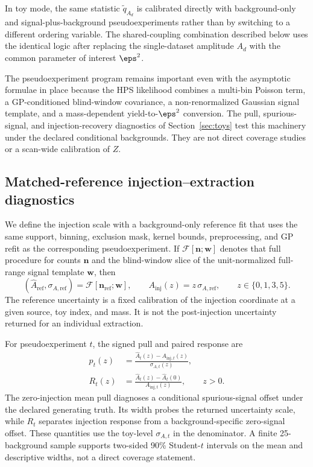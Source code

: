 In toy mode, the same statistic $\tilde q_{A_d}$ is calibrated directly with
background-only and signal-plus-background pseudoexperiments rather than by switching
to a different ordering variable. The shared-coupling combination described below uses
the identical logic after replacing the single-dataset amplitude $A_d$ with the common
parameter of interest $\eps^2$.

The pseudoexperiment program remains important even with the asymptotic formulae in
place because the HPS likelihood combines a multi-bin Poisson term, a GP-conditioned
blind-window covariance, a non-renormalized Gaussian signal template, and a
mass-dependent yield-to-$\eps^2$ conversion. The pull, spurious-signal, and
injection-recovery diagnostics of Section~\ref{sec:toys} test this machinery under the
declared conditional backgrounds. They are not direct \CLs{} coverage studies or a
scan-wide calibration of $Z$.

\subsection{Matched-reference injection--extraction diagnostics}
\label{sec:matched-reference-diagnostics}

We define the injection scale with a background-only reference fit that uses the same
support, binning, exclusion mask, kernel bounds, preprocessing, and GP refit as the
corresponding pseudoexperiment. If
$\mathcal{F}[\bm n;\bm w]$ denotes that full procedure for counts $\bm n$ and the
blind-window slice of the unit-normalized full-range signal template $\bm w$, then
\begin{equation}
(\widehat A_{\mathrm{ref}},\sigma_{A,\mathrm{ref}})
=\mathcal{F}[\bm n_{\mathrm{ref}};\bm w],
\qquad
A_{\mathrm{inj}}(z)=z\,\sigma_{A,\mathrm{ref}},
\qquad z\in\{0,1,3,5\}.
\label{eq:v4p9-matched-reference-axis}
\end{equation}
The reference uncertainty is a fixed calibration of the injection coordinate at a
given source, toy index, and mass.  It is not the post-injection uncertainty returned
for an individual extraction.

For pseudoexperiment $t$, the signed pull and paired response are
\begin{align}
p_t(z)&=\frac{\widehat A_t(z)-A_{\mathrm{inj},t}(z)}
                  {\sigma_{A,t}(z)},
\label{eq:v4p9-pull}\\
R_t(z)&=\frac{\widehat A_t(z)-\widehat A_t(0)}
                  {A_{\mathrm{inj},t}(z)},\qquad z>0.
\label{eq:v4p9-paired-response}
\end{align}
The zero-injection mean pull diagnoses a conditional spurious-signal offset under the
declared generating truth.  Its width probes the returned uncertainty scale, while
$R_t$ separates injection response from a background-specific zero-signal offset.
These quantities use the toy-level $\sigma_{A,t}$ in the denominator.  A finite
25-background sample supports two-sided 90\% Student-$t$ intervals on the mean and descriptive
widths, not a direct coverage statement.

